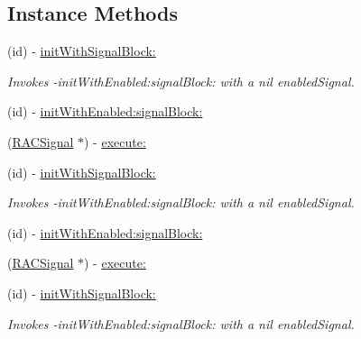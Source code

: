 \subsection*{Instance Methods}
\begin{DoxyCompactItemize}
\item 
\mbox{\label{interface_r_a_c_command_ac1adc323edfb8a4c0beaff631ab76704}} 
(id) -\/ \mbox{\hyperlink{interface_r_a_c_command_ac1adc323edfb8a4c0beaff631ab76704}{init\+With\+Signal\+Block\+:}}
\begin{DoxyCompactList}\small\item\em Invokes -\/init\+With\+Enabled\+:signal\+Block\+: with a nil {\ttfamily enabled\+Signal}. \end{DoxyCompactList}\item 
(id) -\/ \mbox{\hyperlink{interface_r_a_c_command_a753274fc1cc9abfebbd5488a0a09adab}{init\+With\+Enabled\+:signal\+Block\+:}}
\item 
(\mbox{\hyperlink{interface_r_a_c_signal}{R\+A\+C\+Signal}} $\ast$) -\/ \mbox{\hyperlink{interface_r_a_c_command_a91d8d0063d512d5989382e89013a0d74}{execute\+:}}
\item 
\mbox{\label{interface_r_a_c_command_ac1adc323edfb8a4c0beaff631ab76704}} 
(id) -\/ \mbox{\hyperlink{interface_r_a_c_command_ac1adc323edfb8a4c0beaff631ab76704}{init\+With\+Signal\+Block\+:}}
\begin{DoxyCompactList}\small\item\em Invokes -\/init\+With\+Enabled\+:signal\+Block\+: with a nil {\ttfamily enabled\+Signal}. \end{DoxyCompactList}\item 
(id) -\/ \mbox{\hyperlink{interface_r_a_c_command_a753274fc1cc9abfebbd5488a0a09adab}{init\+With\+Enabled\+:signal\+Block\+:}}
\item 
(\mbox{\hyperlink{interface_r_a_c_signal}{R\+A\+C\+Signal}} $\ast$) -\/ \mbox{\hyperlink{interface_r_a_c_command_a91d8d0063d512d5989382e89013a0d74}{execute\+:}}
\item 
\mbox{\label{interface_r_a_c_command_ac1adc323edfb8a4c0beaff631ab76704}} 
(id) -\/ \mbox{\hyperlink{interface_r_a_c_command_ac1adc323edfb8a4c0beaff631ab76704}{init\+With\+Signal\+Block\+:}}
\begin{DoxyCompactList}\small\item\em Invokes -\/init\+With\+Enabled\+:signal\+Block\+: with a nil {\ttfamily enabled\+Signal}. \end{DoxyCompactList}\item 

\end{DoxyCompactItemize}
